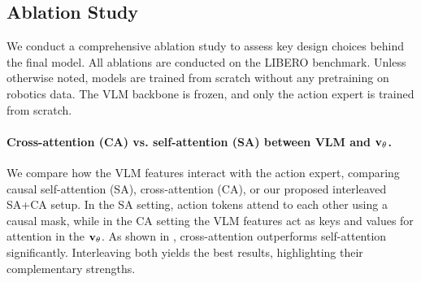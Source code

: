 







\subsection{Ablation Study}
We conduct a comprehensive ablation study to assess key design choices behind the final \ours model. 
All ablations are conducted on the LIBERO benchmark. Unless otherwise noted, models are trained from scratch without any pretraining on robotics data. The VLM backbone is frozen, and only the action expert is trained from scratch.



\paragraph{Cross-attention (CA) vs. self-attention (SA) between VLM and \( \mathbf{v}_\theta \).}
We compare how the VLM features interact with the action expert, comparing causal self-attention (SA), cross-attention (CA), or our proposed interleaved SA+CA setup. 
In the SA setting, action tokens attend to each other using a causal mask, while in the CA setting the VLM features act as keys and values for attention in the \( \mathbf{v}_\theta \). 
As shown in , cross-attention outperforms self-attention significantly. Interleaving both yields the best results, highlighting their complementary strengths.

